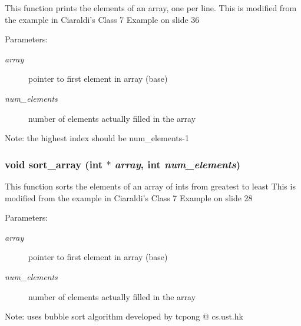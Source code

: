 This function prints the elements of an array, one per line. This is modified from the example in Ciaraldi's Class 7 Example on slide 36 \begin{Desc}
\item[Parameters:]
\begin{description}
\item[{\em array}]pointer to first element in array (base) \item[{\em num\_\-elements}]number of elements actually filled in the array \end{description}
\end{Desc}
\begin{Desc}
\item[Note:]the highest index should be num\_\-elements-1 \end{Desc}
\subsubsection{\setlength{\rightskip}{0pt plus 5cm}void sort\_\-array (int $\ast$ {\em array}, int {\em num\_\-elements})}\label{sort_8h_8896f0ce55dd25259e2141e714d6ef93}


This function sorts the elements of an array of ints from greatest to least This is modified from the example in Ciaraldi's Class 7 Example on slide 28 \begin{Desc}
\item[Parameters:]
\begin{description}
\item[{\em array}]pointer to first element in array (base) \item[{\em num\_\-elements}]number of elements actually filled in the array \end{description}
\end{Desc}
\begin{Desc}
\item[Note:]uses bubble sort algorithm developed by tcpong @ cs.ust.hk \end{Desc}
